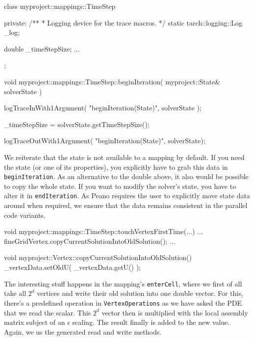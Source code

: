 \begin{code}
class myproject::mappings::TimeStep {
 private:
  /**
   * Logging device for the trace macros.
   */
  static tarch::logging::Log  _log;
    
  double _timeStepSize;
  ...
};


void myproject::mappings::TimeStep::beginIteration(
  myproject::State&  solverState
) {
  logTraceInWith1Argument( "beginIteration(State)", solverState );

  _timeStepSize = solverState.getTimeStepSize();

  logTraceOutWith1Argument( "beginIteration(State)", solverState);
}
\end{code}

\noindent
We reiterate that the state is not available to a mapping by default. If you
need the state (or one of its properties), you explicitly have to grab this data
in \texttt{beginIteration}. As an alternative to the double above, it also would
be possible to copy the whole state. If you want to modify the solver's state,
you have to alter it in \texttt{endIteration}. As Peano requires the user to
explicitly move state data around when required, we ensure that the data remains
consistent in the parallel code variants.

\begin{code}
void myproject::mappings::TimeStep::touchVertexFirstTime(...) {
 ...  
 fineGridVertex.copyCurrentSolutionIntoOldSolution();
 ...  
}

void myproject::Vertex::copyCurrentSolutionIntoOldSolution() {
  _vertexData.setOldU( _vertexData.getU() );
}
\end{code}

\noindent
The interesting stuff happens in the mapping's \texttt{enterCell}, 
where we first of all take all $2^d$ vertices and write their old solution into
one double vector. 
For this, there's a predefined operation in \texttt{VertexOperations} as we have
asked the PDE that we read the scalar.
This $2^d$ vector then is multiplied with the local assembly matrix subject of
an $\epsilon$ scaling.
The result finally is added to the new value.
Again, we us the generated read and write methods.

